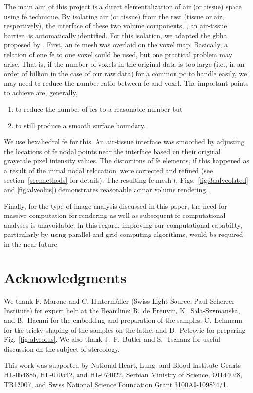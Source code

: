 The main aim of this project is a direct elementalization of air (or tissue) space using \ac{fe} technique. By isolating air (or tissue) from the rest (tissue or air, respectively), the interface of these two volume components, \ie, an air-tissue barrier, is automatically identified. For this isolation, we adapted the \ac{gbha} proposed by \citet{Schneiders1996}. First, an \ac{fe} mesh was overlaid on the voxel map. Basically, a relation of one \ac{fe} to one voxel could be used, but one practical problem may arise. That is, if the number of voxels in the original data is too large (i.e., in an order of billion in the case of our raw data) for a common \acs{pc} to handle easily, we may need to reduce the number ratio between \ac{fe} and voxel. The important points to achieve are, generally, 
\begin{enumerate}
	\item to reduce the number of \acp{fe} to a reasonable number but
	\item to still produce a smooth surface boundary.
\end{enumerate}
We use hexahedral \ac{fe} for this. An air-tissue interface was smoothed by adjusting the locations of \ac{fe} nodal points near the interface based on their original grayscale pixel intensity values. The distortions of \ac{fe} elements, if this happened as a result of the initial nodal relocation, were corrected and refined (see section~\ref{sec:methods} for details). The resulting \threed \ac{fe} mesh (\eg, Figs.~\ref{fig:3dalveolated} and \ref{fig:alveolus}) demonstrates reasonable acinar volume rendering.

Finally, for the type of image analysis discussed in this paper, the need for massive computation for \threed rendering as well as subsequent \ac{fe} computational analyses is unavoidable. In this regard, improving our computational capability, particularly by using parallel and grid computing algorithms, would be required in the near future.

\section{Acknowledgments}
We thank F. Marone and C. Hintermüller (Swiss Light Source, Paul Scherrer Institute) for expert help at the Beamline; B.\ de Breuyin, K.\ Sala-Szymanska, and B.\ Haenni for the embedding and preparation of the samples; C.\ Lehmann for the tricky shaping of the samples on the lathe; and D.\ Petrovic for preparing Fig.~\ref{fig:alveolus}. We also thank J.\ P.\ Butler and S.\ Tschanz for useful discussion on the subject of stereology.

This work was supported by National Heart, Lung, and Blood Institute Grants HL-054885, HL-070542, and HL-074022, Serbian Ministry of Science, OI144028, TR12007, and Swiss National Science Foundation Grant 3100A0-109874/1.
%
%